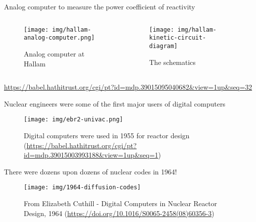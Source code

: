 \documentclass[pdf,aspectratio=169]{beamer}
\begin{document}
\begin{frame}{Analog computer to measure the power coefficient of reactivity}
\begin{columns}
    \begin{column}{0.5\textwidth}
        \begin{figure}[ht]
        \centering
        \texttt{[image: img/hallam-analog-computer.png]}
        \caption{\small Analog computer at Hallam}
        \end{figure}
    \end{column}
    \begin{column}{0.5\textwidth}
        \begin{figure}[ht]
        \centering
        \texttt{[image: img/hallam-kinetic-circuit-diagram]}
        \caption{\small The schematics}
        \end{figure}
    \end{column}
\end{columns}
    \centering \tiny \url{https://babel.hathitrust.org/cgi/pt?id=mdp.39015095040682&view=1up&seq=32}
\end{frame}

\begin{frame}{Nuclear engineers were some of the first major users of digital computers}
        \begin{figure}[ht]
        \centering
            \texttt{[image: img/ebr2-univac.png]}
    \caption{\small Digital computers were used in 1955 for reactor design
            (\url{https://babel.hathitrust.org/cgi/pt?id=mdp.39015003993188&view=1up&seq=1})}
        \end{figure}
\end{frame}

\begin{frame}{There were dozens upon dozens of nuclear codes in 1964!}
        \begin{figure}[ht]
        \centering
            \texttt{[image: img/1964-diffusion-codes]}
    \caption{\small From Elizabeth Cuthill - Digital Computers in Nuclear Reactor Design, 1964
            (\url{https://doi.org/10.1016/S0065-2458(08)60356-3})}
        \end{figure}
\end{frame}
\end{document}
